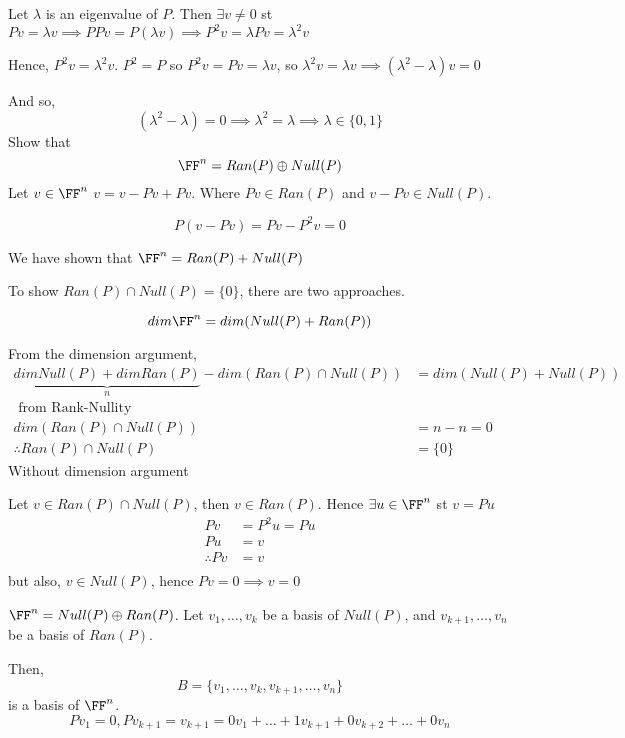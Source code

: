 \documentclass[11pt]{scrartcl}
\begin{document}
\begin{soln}
	\begin{enumerate}
    \ii[]
		\ii
		Let $\lambda$ is an eigenvalue of $P$. Then $\exists v \neq 0$ st $Pv = \lambda v \implies PPv = P(\lambda v) \implies P^2v = \lambda Pv = \lambda^2 v$
		
		Hence, $P^2v = \lambda^2 v$. $P^2 = P$ so $P^2v = Pv = \lambda v$, so $\lambda^2 v = \lambda v \implies (\lambda^2 -\lambda)v = 0$
		
		And so, 
		\[
		(\lambda^2 - \lambda) = 0 \implies \lambda^2 = \lambda \implies \lambda \in \{0,1\}
		\]
		\ii
		Show that 
		\[
		\FF^n = Ran(P) \oplus Null(P)
		\]
		Let $v \in \FF^n$ $v = v-Pv+Pv$. Where $Pv \in Ran(P)$ and $v-Pv \in Null(P)$.
		
		\[
		P(v-Pv) = Pv-P^2v = 0
		\]
		
		We have shown that $\FF^n = Ran(P) + Null(P)$
		
		To show $Ran(P) \cap Null(P) = \{0\}$, there are two approaches.
		\begin{itemize}
			\ii
			\[
			dim \FF^n = dim(Null(P) + Ran(P))
			\]
			
			From the dimension argument,
			\begin{align*}
			\underbrace{dim Null(P) + dim Ran(P)}_{n} - dim (Ran(P) \cap Null(P)) &= dim(Null(P) + Null(P))\\
			 \text{ from Rank-Nullity}\\
			dim (Ran(P) \cap Null(P)) &= n-n = 0\\
			\therefore Ran(P) \cap Null(P) &= \{0\}
			\end{align*}
			\ii
			Without dimension argument
			
			Let $v \in Ran(P) \cap Null(P)$, then $v \in Ran(P)$. Hence $\exists u \in \FF^n$ st $v = Pu$
			\begin{align*}
				Pv &= P^2u = Pu\\
				Pu &= v\\
				\therefore Pv &= v\\
			\end{align*}
			but also, $v \in Null(P)$, hence $Pv = 0 \implies v = 0$
		\end{itemize}
		\ii
		$\FF^n = Null(P) \oplus Ran(P)$. Let $v_1, \dots, v_k$ be a basis of $Null(P)$, and $v_{k+1}, \dots, v_{n}$ be a basis of $Ran(P)$.
		
		Then, 
		\[
		B = \{v_1, \dots, v_k, v_{k+1}, \dots, v_n\}
		\]
		is a basis of $\FF^n$. 
		\[
		Pv_1 = 0, Pv_{k+1} = v_{k+1} = 0v_1 + \dots + 1v_{k+1} + 0v_{k+2} + \dots + 0v_n
		\]
		

\end{enumerate}
\end{soln}
\end{document}
